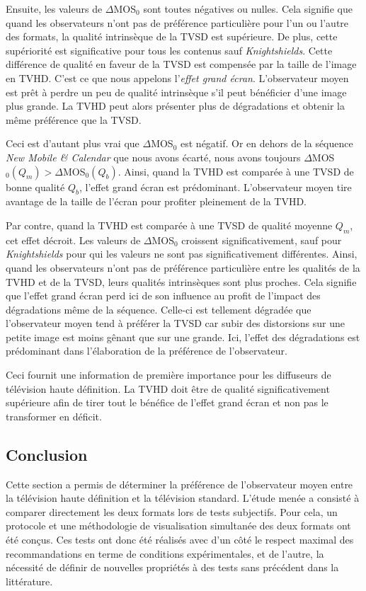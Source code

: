 Ensuite, les valeurs de $\Delta$MOS$_0$ sont toutes négatives ou nulles. Cela signifie que quand les observateurs n'ont pas de préférence particulière pour l'un ou l'autre des formats, la qualité intrinsèque de la TVSD est supérieure. De plus, cette supériorité est significative pour tous les contenus sauf \emph{Knightshields}. Cette différence de qualité en faveur de  la TVSD est compensée par la taille de l'image en TVHD. C'est ce que nous appelons l'\emph{effet grand écran}. L'observateur moyen est prêt à perdre un peu de qualité intrinsèque s'il peut bénéficier d'une image plus grande. La TVHD peut alors présenter plus de dégradations et obtenir la même préférence que la TVSD.

Ceci est d'autant plus vrai que $\Delta$MOS$_0$ est négatif. Or en dehors de la séquence \emph{New Mobile \& Calendar} que nous avons écarté, nous avons toujours $\Delta$MOS$_0(Q_m) > \Delta$MOS$_0(Q_b)$. Ainsi, quand la TVHD est comparée à une TVSD de bonne qualité $Q_b$, l'effet grand écran est prédominant. L'observateur moyen tire avantage de la taille de l'écran pour profiter pleinement de la TVHD.

Par contre, quand la TVHD est comparée à une TVSD de qualité moyenne $Q_m$, cet effet décroit. Les valeurs de $\Delta$MOS$_0$ croissent significativement, sauf pour \emph{Knightshields} pour qui les valeurs ne sont pas significativement différentes. Ainsi, quand les observateurs n'ont pas de préférence particulière entre les qualités de la TVHD et de la TVSD, leurs qualités intrinsèques sont plus proches. Cela signifie que l'effet grand écran perd ici de son influence au profit de l'impact des dégradations même de la séquence. Celle-ci est tellement dégradée que l'observateur moyen tend à préférer la TVSD car subir des distorsions sur une petite image est moins gênant que sur une grande. Ici, l'effet des dégradations est prédominant dans l'élaboration de la préférence de l'observateur.

Ceci fournit une information de première importance pour les diffuseurs de télévision haute définition. La TVHD doit être de qualité significativement supérieure afin de tirer tout le bénéfice de l'effet grand écran et non pas le transformer en déficit. %


\subsection{Conclusion}
Cette section a permis de déterminer la préférence de l'observateur moyen entre la télévision haute définition et la télévision standard. L'étude menée a consisté à comparer directement les deux formats lors de tests subjectifs. Pour cela, un protocole et une méthodologie de visualisation simultanée des deux formats ont été conçus. Ces tests ont donc été réalisés avec d'un côté le respect maximal des recommandations en terme de conditions expérimentales, et de l'autre, la nécessité de définir de nouvelles propriétés à des tests sans précédent dans la littérature.

